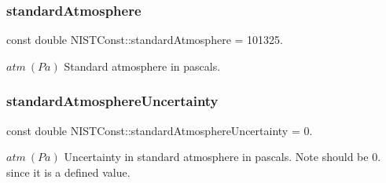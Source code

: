 \subsubsection{\texorpdfstring{standard\+Atmosphere}{standardAtmosphere}}
{\footnotesize\ttfamily const double N\+I\+S\+T\+Const\+::standard\+Atmosphere = 101325.}

$atm \ (Pa)$ Standard atmosphere in pascals. \mbox{\label{group___standard_atmosphere_ga784dc63051d7f1dca50f4f2843c8fbcf}} 
\subsubsection{\texorpdfstring{standard\+Atmosphere\+Uncertainty}{standardAtmosphereUncertainty}}
{\footnotesize\ttfamily const double N\+I\+S\+T\+Const\+::standard\+Atmosphere\+Uncertainty = 0.}

$atm \ (Pa)$ Uncertainty in standard atmosphere in pascals. Note should be 0. since it is a defined value. 